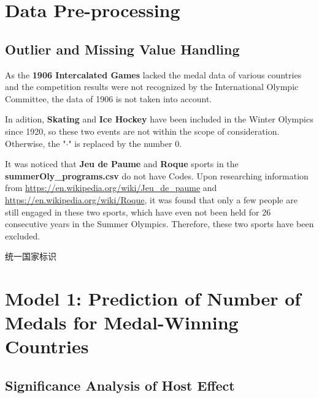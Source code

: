 \documentclass{mcmthesis}
\begin{document}
\section{Data Pre-processing}

\subsection{Outlier and Missing Value Handling}
As the \textbf{1906 Intercalated Games} lacked the medal data of various countries and the competition results were not recognized by the International Olympic Committee, the data of 1906 is not taken into account.

In adition, \textbf{Skating} and \textbf{Ice Hockey} have been included in the Winter Olympics since 1920, so these two events are not within the scope of consideration. Otherwise, the "$\cdot$" is replaced by the number $0$. 

It was noticed that \textbf{Jeu de Paume} and \textbf{Roque} sports in the {\bf summerOly\_programs.csv} do not have Codes. Upon researching information from {\color{blue}\url{https://en.wikipedia.org/wiki/Jeu_de_paume}} and {\color{blue}\url{https://en.wikipedia.org/wiki/Roque}}, it was found that only a few people are still engaged in these two sports, which have even not been held for 26 consecutive years in the Summer Olympics. Therefore, these two sports have been excluded.



统一国家标识













\section{Model 1: Prediction of Number of Medals for Medal-Winning Countries}

\subsection{Significance Analysis of Host Effect}
\end{document}
